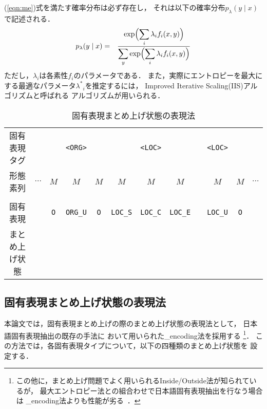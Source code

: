 (\ref{eqn:me})式を満たす確率分布は必ず存在し，
それは以下の確率分布$p_{\lambda}(y\mid x)$ で記述される．
\begin{eqnarray*}\label{eqn:plambda}
  p_{\lambda}(y\mid x) & = & 
	\frac{\displaystyle \exp\Bigl(\sum_{i}\lambda_{i}f_i(x,y)\Bigr)}
		{\displaystyle \sum_y\exp\Bigl(\sum_{i}\lambda_{i}f_i(x,y)\Bigr)}
\end{eqnarray*}
ただし，$\lambda_i$は各素性$f_i$のパラメータである．
また，実際にエントロピーを最大にする最適なパラメータ${\lambda^{\ast}}_{i}$を推定するには，
Improved Iterative Scaling(IIS)アルゴリズム\cite{Pietra97a,Berger96a}と呼ばれる
アルゴリズムが用いられる．

\begin{table*}
\begin{center}
\caption{固有表現まとめ上げ状態の表現法}
\label{tab:NEcode}
        \begin{tabular}{|c|cc|c|c|ccc|c|c|cc|} \hline
        固有表現タグ & & \multicolumn{1}{c}{} & \multicolumn{1}{c}{\tt <ORG>} 
                & \multicolumn{1}{c}{} & \multicolumn{3}{c}{\tt <LOC>} 
                & \multicolumn{1}{c}{} & \multicolumn{1}{c}{\tt <LOC>}  & & 
                \\ \cline{4-4}\cline{6-8}\cline{10-10}
        形態素列 & $\cdots$ & $M$ & $M$ & $M$ 
                & $M$ & $M$ & $M$ & & $M$ & $M$ & $\cdots$ 
                \\ \cline{4-4}\cline{6-8}\cline{10-10}
                & \multicolumn{11}{c|}{} \\ \hline 
固有表現 & 
                & \multicolumn{1}{c}{\tt O} & \multicolumn{1}{c}{\tt ORG\_U} 
                & \multicolumn{1}{c}{\tt O}  
                & \multicolumn{1}{c}{\tt LOC\_S} & \multicolumn{1}{c}{\tt LOC\_C} 
                & \multicolumn{1}{c}{\tt LOC\_E} & \multicolumn{1}{c}{}
                & \multicolumn{1}{c}{\tt LOC\_U} 
                & \multicolumn{1}{c}{\tt O} &   \\
まとめ上げ状態 &  \multicolumn{11}{|c|}{} \\ \hline
        \end{tabular}
\end{center}
\end{table*}

\subsection{固有表現まとめ上げ状態の表現法}
\label{subsec:tagck}

本論文では，固有表現まとめ上げの際のまとめ上げ状態の表現法として，
日本語固有表現抽出の既存の手法\cite{Sekine98a,Borthwick99aj,Uchimoto00aj}に
おいて用いられた\sekine_encoding法を採用する
\footnote{
  この他に，まとめ上げ問題でよく用いられるInside/Outside法が知られているが，
  最大エントロピー法との組合わせで日本語固有表現抽出を行なう場合は
  \sekine_encoding法よりも性能が劣る~\cite{Sassano00bjx}．
}．
この方法では，各固有表現タイプについて，以下の四種類のまとめ上げ状態を
設定する．



